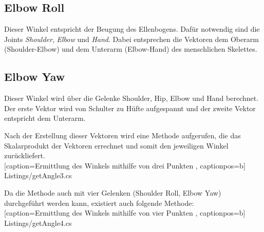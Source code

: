 \subsection{Elbow Roll}
Dieser Winkel entspricht der Beugung des Ellenbogens. Dafür notwendig sind die Joints \textit{Shoulder}, \textit{Elbow} und \textit{Hand}. Dabei entsprechen die Vektoren dem Oberarm (Shoulder-Elbow) und dem Unterarm (Elbow-Hand) des menschlichen Skelettes.

\subsection{Elbow Yaw}
Dieser Winkel wird über die Gelenke Shoulder, Hip, Elbow und Hand berechnet. Der erste Vektor wird von Schulter zu Hüfte aufgespannt und der zweite Vektor entspricht dem Unterarm. 


Nach der Erstellung dieser Vektoren wird eine Methode aufgerufen, die das Skalarprodukt der Vektoren errechnet und somit den jeweiligen Winkel zurückliefert. \\


    [caption={Ermittlung des Winkels mithilfe von drei Punkten}
       \label{lst:3joints},
       captionpos=b]
 {Listings/getAngle3.cs}


\noindent Da die Methode auch mit vier Gelenken (Shoulder Roll, Elbow Yaw) durchgeführt werden kann, existiert auch folgende Methode: \\


    [caption={Ermittlung des Winkels mithilfe von vier Punkten}
       \label{lst:4joints},
       captionpos=b]
 {Listings/getAngle4.cs}
